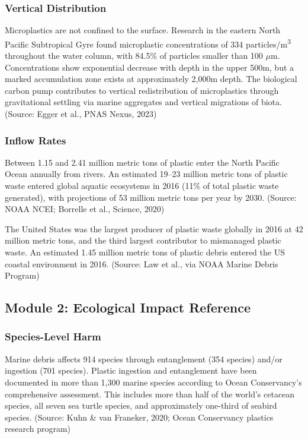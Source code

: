 \documentclass[11pt,letterpaper]{article}
\begin{document}
\subsubsection{Vertical Distribution}
Microplastics are not confined to the surface. Research in the eastern North Pacific Subtropical Gyre found microplastic concentrations of 334 particles/m\textsuperscript{3} throughout the water column, with 84.5\% of particles smaller than 100 $\mu$m. Concentrations show exponential decrease with depth in the upper 500m, but a marked accumulation zone exists at approximately 2,000m depth. The biological carbon pump contributes to vertical redistribution of microplastics through gravitational settling via marine aggregates and vertical migrations of biota. (Source: Egger et al., PNAS Nexus, 2023)

\subsubsection{Inflow Rates}
Between 1.15 and 2.41 million metric tons of plastic enter the North Pacific Ocean annually from rivers. An estimated 19--23 million metric tons of plastic waste entered global aquatic ecosystems in 2016 (11\% of total plastic waste generated), with projections of 53 million metric tons per year by 2030. (Source: NOAA NCEI; Borrelle et al., Science, 2020)

The United States was the largest producer of plastic waste globally in 2016 at 42 million metric tons, and the third largest contributor to mismanaged plastic waste. An estimated 1.45 million metric tons of plastic debris entered the US coastal environment in 2016. (Source: Law et al., via NOAA Marine Debris Program)

\subsection{Module 2: Ecological Impact Reference}

\subsubsection{Species-Level Harm}
Marine debris affects 914 species through entanglement (354 species) and/or ingestion (701 species). Plastic ingestion and entanglement have been documented in more than 1,300 marine species according to Ocean Conservancy's comprehensive assessment. This includes more than half of the world's cetacean species, all seven sea turtle species, and approximately one-third of seabird species. (Source: Kuhn \& van Franeker, 2020; Ocean Conservancy plastics research program)
\end{document}
